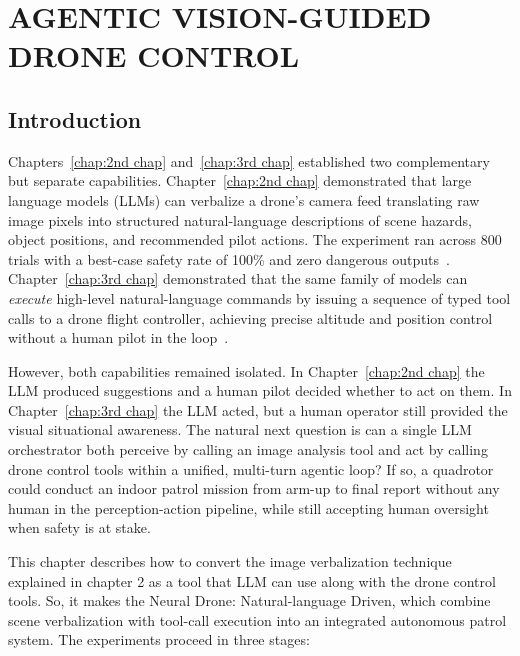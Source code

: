 \chapter{AGENTIC VISION-GUIDED DRONE CONTROL}
\label{chap:4th chap}

\section{Introduction}
\label{sec:ch4_intro}

Chapters~\ref{chap:2nd chap} and~\ref{chap:3rd chap} established two complementary but separate capabilities. 
Chapter~\ref{chap:2nd chap} demonstrated that large language models (LLMs) can verbalize a drone's camera feed translating raw image pixels into structured natural-language descriptions of scene hazards, object positions, and recommended pilot actions. The experiment ran across 800 trials with a best-case safety rate of 100\% and zero dangerous
outputs~\cite{vemprala2023chatgpt}.  Chapter~\ref{chap:3rd chap} demonstrated that the same
family of models can \emph{execute} high-level natural-language commands by issuing a sequence of typed tool calls to a drone flight controller, achieving precise altitude and position control without a human pilot in the loop~\cite{yao2022react}.

However, both capabilities remained isolated.
In Chapter~\ref{chap:2nd chap} the LLM produced suggestions and a human pilot decided whether to act on them.
In Chapter~\ref{chap:3rd chap} the LLM acted, but a human operator still provided the visual situational awareness.  
The natural next question is can a single LLM orchestrator both perceive by calling an image analysis tool and act by calling drone control tools within a unified, multi-turn agentic loop?
If so, a quadrotor could conduct an indoor patrol mission from arm-up to final report without any human in the perception-action pipeline, while still accepting human oversight when safety is at stake.

This chapter describes how to convert the image verbalization technique explained in chapter 2 as a tool that LLM can use along with the drone control tools. 
So, it makes the Neural Drone: Natural-language Driven, which combine scene verbalization with tool-call execution into an integrated autonomous patrol system. 
The experiments proceed in three stages:

